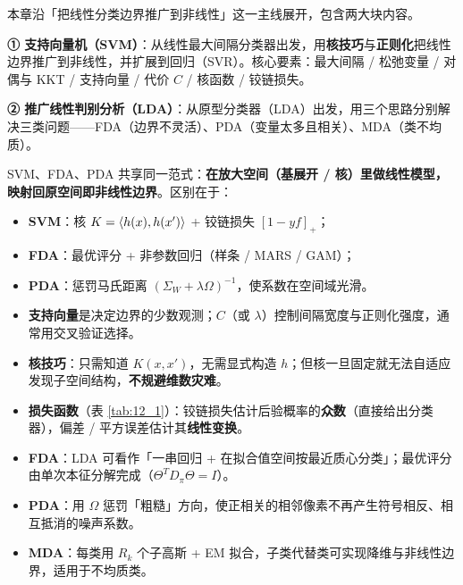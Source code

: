 本章沿「把线性分类边界推广到非线性」这一主线展开，包含两大块内容。

\begin{remark}[两条主线]
\textbf{① 支持向量机（SVM）}：从线性最大间隔分类器出发，用\textbf{核技巧}与\textbf{正则化}把线性边界推广到非线性，并扩展到回归（SVR）。核心要素：最大间隔 / 松弛变量 / 对偶与 KKT / 支持向量 / 代价 $C$ / 核函数 / 铰链损失。

\textbf{② 推广线性判别分析（LDA）}：从原型分类器（LDA）出发，用三个思路分别解决三类问题——FDA（边界不灵活）、PDA（变量太多且相关）、MDA（类不均质）。
\end{remark}

\begin{remark}
SVM、FDA、PDA 共享同一范式：\textbf{在放大空间（基展开 / 核）里做线性模型，映射回原空间即非线性边界}。区别在于：
\begin{itemize}
\item \textbf{SVM}：核 $K=\langle h(x),h(x')\rangle$ + 铰链损失 $[1-yf]_+$；
\item \textbf{FDA}：最优评分 + 非参数回归（样条 / MARS / GAM）；
\item \textbf{PDA}：惩罚马氏距离 $(\Sigma_W+\lambda\Omega)^{-1}$，使系数在空间域光滑。
\end{itemize}
\end{remark}

\begin{remark}[关键要点]
\leavevmode \par
\begin{itemize}
\item \textbf{支持向量}是决定边界的少数观测；$C$（或 $\lambda$）控制间隔宽度与正则化强度，通常用交叉验证选择。
\item \textbf{核技巧}：只需知道 $K(x,x')$，无需显式构造 $h$；但核一旦固定就无法自适应发现子空间结构，\textbf{不规避维数灾难}。
\item \textbf{损失函数}（表 \ref{tab:12_1}）：铰链损失估计后验概率的\textbf{众数}（直接给出分类器），偏差 / 平方误差估计其\textbf{线性变换}。
\item \textbf{FDA}：LDA 可看作「一串回归 + 在拟合值空间按最近质心分类」；最优评分由单次本征分解完成（$\Theta^T D_\pi\Theta=I$）。
\item \textbf{PDA}：用 $\Omega$ 惩罚「粗糙」方向，使正相关的相邻像素不再产生符号相反、相互抵消的噪声系数。
\item \textbf{MDA}：每类用 $R_k$ 个子高斯 + EM 拟合，子类代替类可实现降维与非线性边界，适用于不均质类。
\end{itemize}
\end{remark}

